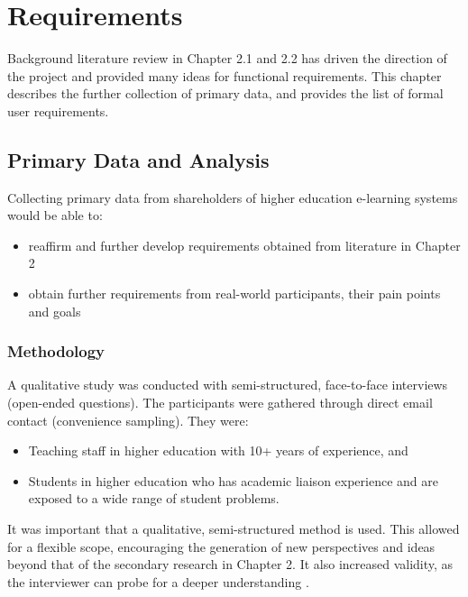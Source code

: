 \chapter{Requirements}
\graphicspath{{Chapter4/Figs/Raster/}{Chapter4/Figs/}}

Background literature review in Chapter 2.1 and 2.2 has driven the direction of the project and
provided many ideas for functional requirements. This chapter describes the further collection of primary
data, and provides the list of formal user requirements.

\section{Primary Data and Analysis}
Collecting primary data from shareholders of higher education e-learning systems would be able to:
\begin{itemize}
	\setlength\itemsep{0em}	
	\item reaffirm and further develop requirements obtained from literature in Chapter 2
	\item obtain further requirements from real-world participants, their pain points and goals
\end{itemize}

\subsection{Methodology}

A qualitative study was conducted with semi-structured, face-to-face interviews (open-ended questions). 
The participants were gathered through direct email contact (convenience sampling). 
They were:
\begin{itemize}
	\setlength\itemsep{0em}	
	\item Teaching staff in higher education with 10+ years of experience, and
	\item Students in higher education who has academic liaison experience and are exposed to a wide range of student problems.
\end{itemize}

It was important that a qualitative, semi-structured method is used. 
This allowed for a flexible scope, encouraging the generation of new perspectives and 
ideas beyond that of the secondary research in Chapter 2.
It also increased validity, as the interviewer can probe for a deeper understanding
\citep{mcleod2014interviews}.

